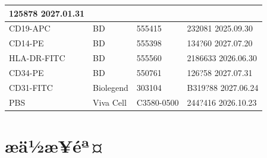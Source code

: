 \documentclass[UTF8,10pt,a4paper,fontset=fandol]{ctexart}
\newcommand{\fieldvalue}[1]{#1}
\newcommand{\handwritten}[1]{#1}
\begin{document}
\begin{center}
\begin{tabularx}{\textwidth}{|p{}|p{}|X|X|}
\fieldvalue{\handwritten{125878}}\quad
\fieldvalue{\handwritten{2027.01.31}} \\ \hline
CD19-APC & BD & 555415 &
\fieldvalue{\handwritten{232081}}\quad
\fieldvalue{\handwritten{2025.09.30}} \\ \hline
CD14-PE & BD & 555398 &
\fieldvalue{\handwritten{134?60}}\quad
\fieldvalue{\handwritten{2027.07.20}} \\ \hline
HLA-DR-FITC & BD & 555560 &
\fieldvalue{\handwritten{2186633}}\quad
\fieldvalue{\handwritten{2026.06.30}} \\ \hline
CD34-PE & BD & 550761 &
\fieldvalue{\handwritten{126?58}}\quad
\fieldvalue{\handwritten{2027.07.31}} \\ \hline
CD31-FITC & Biolegend & 303104 &
\fieldvalue{\handwritten{B319?88}}\quad
\fieldvalue{\handwritten{2027.06.24}} \\ \hline
PBS & Viva Cell & C3580-0500 &
\fieldvalue{\handwritten{244?416}}\quad
\fieldvalue{\handwritten{2026.10.23}} \\ \hline
\end{tabularx}
\end{center}

\section{æä½æ­¥éª¤}
\end{document}
